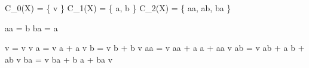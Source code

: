 
C_{0}(X) = \{ v \}
C_{1}(X) = \{ a, b \}
C_{2}(X) = \{ aa, ab, ba \}

\partial aa = b
\partial ba = a

\Delta v = v \otimes v
\Delta a = v \otimes a + a \otimes v
\Delta b = v \otimes b + b \otimes v
\Delta aa = v \otimes aa + a \otimes a + aa \otimes v
\Delta ab = v \otimes ab + a \otimes b + ab \otimes v
\Delta ba = v \otimes ba + b \otimes a + ba \otimes v